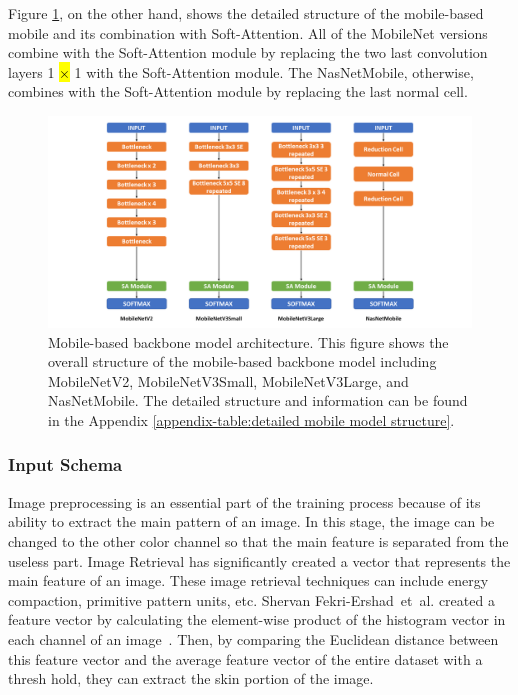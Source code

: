 \documentclass[sensors,article,accept,pdftex,moreauthors]{Definitions/mdpi}
\begin{document}
	Figure \ref{fig:mobile-model-structure}, on the other hand, shows the detailed structure of the mobile-based mobile and its combination with Soft-Attention. All of the MobileNet versions combine with the Soft-Attention module by replacing the two last convolution layers 1 \hl{$\times$} %
 1 with the Soft-Attention module. The NasNetMobile, otherwise, combines with the Soft-Attention module by replacing the last normal cell. 
	\begin{figure}[H]
		\includegraphics[width=0.9\linewidth]{Definitions/Mobile Model Structure.PNG}
		\caption{{Mobile-based} %
 backbone model architecture. This figure shows the overall structure of the mobile-based backbone model including MobileNetV2, MobileNetV3Small, MobileNetV3Large, and NasNetMobile. The detailed structure and information can be found in the Appendix \ref{appendix-table:detailed mobile model structure}.}
		\label{fig:mobile-model-structure}
	\end{figure}
	
	\subsubsection{Input Schema}
	{Image preprocessing is an essential part of the training process because of its ability to extract the main pattern of an image. In this stage, the image can be changed to the other color channel so that the main feature is separated from the useless part. Image Retrieval  has significantly created a vector that represents the main feature of an image. These image retrieval techniques can include energy compaction, primitive pattern units, etc. Shervan Fekri-Ershad~et~al. created a feature vector by calculating the element-wise product of the histogram vector in each channel of an image~\mbox{\cite{2012.4305}}}. Then, by comparing the Euclidean distance between this feature vector and the average feature vector of the entire dataset with a thresh hold, they can extract the skin portion of the image.
	
\end{document}
